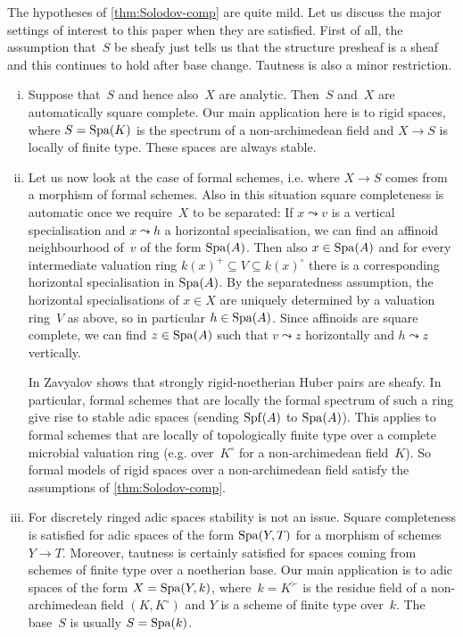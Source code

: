 \begin{rmk} \label{rmk:hypotheses-compactification}
    The hypotheses of \cref{thm:Solodov-comp} are quite mild.
    Let us discuss the major settings of interest to this paper when they are satisfied.
    First of all, the assumption that~$S$ be sheafy just tells us that the structure presheaf is a sheaf and this continues to hold after base change.
    Tautness is also a minor restriction.
    \begin{enumerate}[(i)]
        \item Suppose that~$S$ and hence also~$X$ are analytic.
              Then~$S$ and~$X$ are automatically square complete.
              Our main application here is to rigid spaces, where $S = \operatorname{Spa}(K)$ is the spectrum of a non-archimedean field and $X \to S$ is locally of finite type.
              These spaces are always stable.
        \item Let us now look at the case of formal schemes, i.e. where $X \to S$ comes from a morphism of formal schemes.
              Also in this situation square completeness is automatic once we require~$X$ to be separated:
              If $x \leadsto v$ is a vertical specialisation and $x \leadsto h$ a horizontal specialisation, we can find an affinoid neighbourhood of~$v$ of the form $\operatorname{Spa}(A)$.
              Then also $x \in \operatorname{Spa}(A)$ and for every intermediate valuation ring $k(x)^+ \subseteq V \subseteq k(x)^\circ$ there is a corresponding horizontal specialisation in $\operatorname{Spa}(A)$.
              By the separatedness assumption, the horizontal specialisations of $x \in X$ are uniquely determined by a valuation ring~$V$ as above, so in particular $h \in \operatorname{Spa}(A)$.
              Since affinoids are square complete, we can find $z \in \operatorname{Spa}(A)$ such that $v \leadsto z$ horizontally and $h \leadsto z$ vertically.

              In \cite{ZavyalovSheafy} Zavyalov shows that strongly rigid-noetherian Huber pairs are sheafy.
              In particular, formal schemes that are locally the formal spectrum of such a ring give rise to stable adic spaces (sending $\operatorname{Spf}(A)$ to $\operatorname{Spa}(A)$).
              This applies to formal schemes that are locally of topologically finite type over a complete microbial valuation ring (e.g. over~$K^\circ$ for a non-archimedean field~$K$).
              So formal models of rigid spaces over a non-archimedean field satisfy the assumptions of \cref{thm:Solodov-comp}.
        \item For discretely ringed adic spaces stability is not an issue.
              Square completeness is satisfied for adic spaces of the form $\operatorname{Spa}(Y,T)$ for a morphism of schemes $Y \to T$.
              Moreover, tautness is certainly satisfied for spaces coming from schemes of finite type over a noetherian base.
              Our main application is to adic spaces of the form $X = \operatorname{Spa}(Y,k)$, where~$k=K^\succ$ is the residue field of a non-archimedean field $(K,K^\circ)$ and $Y$ is a scheme of finite type over~$k$.
              The base~$S$ is usually $S = \operatorname{Spa}(k)$.
    \end{enumerate}
\end{rmk}


